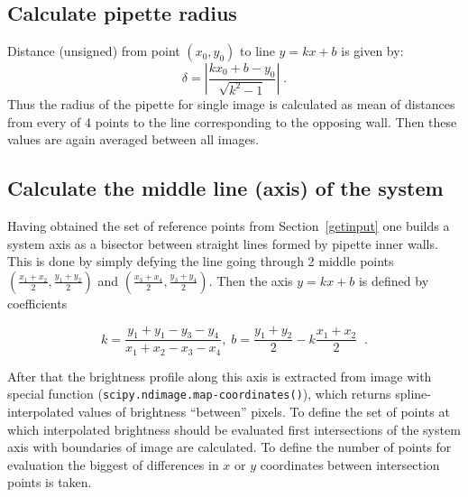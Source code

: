 \documentclass[a4paper,12pt]{article}
\begin{document}
\subsection{Calculate pipette radius}\label{calcpiprad}

Distance (unsigned) from point $\left(x_0,y_0\right)$ to line $y=kx+b$ is given by:
\begin{equation}
\delta = \left|\frac{kx_0+b-y_0}{\sqrt{k^2-1}}\right|\;.
\label{eq:pointtoline}
\end{equation}
Thus the radius of the pipette for single image is calculated as mean of distances from every of 4 points to the line corresponding to the opposing wall. Then these values are again averaged between all images.

\subsection{Calculate the middle line (axis) of the system}\label{calcaxis}

Having obtained the set of reference points from Section~\ref{getinput} one builds a system axis as a bisector between straight lines formed by pipette inner walls. This is done by simply defying the line going through 2 middle points $\left(\frac{x_1+x_2}{2}, \frac{y_1+y_2}{2}\right)$ and $\left(\frac{x_3+x_4}{2}, \frac{y_3+y_4}{2}\right)$. Then the axis $y = kx+b$ is defined by coefficients

\begin{equation}
k = \frac{y_1+y_1-y_3-y_4}{x_1+x_2-x_3-x_4}, \; b = \frac{y_1+y_2}{2} - k\frac{x_1+x_2}{2}\;\;.
\label{eq:axis}
\end{equation}

After that the brightness profile along this axis is extracted from image with special function (\verb|scipy.ndimage.map-coordinates()|), which returns spline-interpolated values of brightness ``between'' pixels. To define the set of points at which interpolated brightness should be evaluated first intersections of the system axis with boundaries of image are calculated. To define the number of points for evaluation the biggest of differences in $x$ or $y$ coordinates between intersection points is taken.
\end{document}

